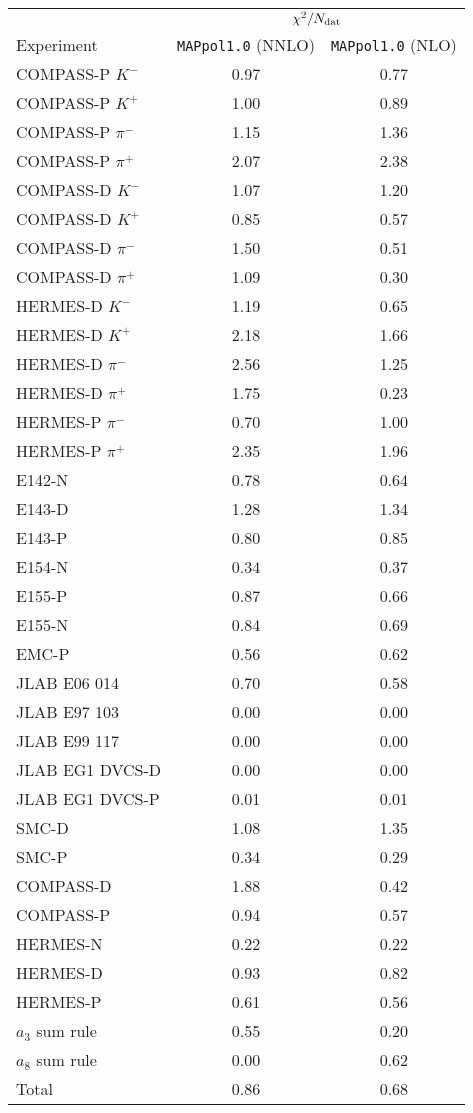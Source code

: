 \begin{tabular}{l@{\hspace{1cm}}c@{\hspace{1cm}}c}
  \toprule \midrule
  \addlinespace
                        & \multicolumn{2}{c}{$\chi^2/N_{\textrm{dat}}$} \\
  \cmidrule(lr){2-3}
      Experiment        &   \texttt{MAPpol1.0} (NNLO)    &    \texttt{MAPpol1.0} (NLO)    \tabularnewline
  \midrule
  \addlinespace
      COMPASS-P $K^-$   &   0.97    &    0.77   \tabularnewline
      COMPASS-P $K^+$   &   1.00    &    0.89   \tabularnewline
    COMPASS-P $\pi^-$   &   1.15    &    1.36   \tabularnewline
    COMPASS-P $\pi^+$   &   2.07    &    2.38   \tabularnewline
      COMPASS-D $K^-$   &   1.07    &    1.20   \tabularnewline
      COMPASS-D $K^+$   &   0.85    &    0.57   \tabularnewline
    COMPASS-D $\pi^-$   &   1.50    &    0.51   \tabularnewline
    COMPASS-D $\pi^+$   &   1.09    &    0.30   \tabularnewline
      HERMES-D  $K^-$   &   1.19    &    0.65   \tabularnewline
      HERMES-D  $K^+$   &   2.18    &    1.66   \tabularnewline
    HERMES-D  $\pi^-$   &   2.56    &    1.25   \tabularnewline
    HERMES-D  $\pi^+$   &   1.75    &    0.23   \tabularnewline
    HERMES-P  $\pi^-$   &   0.70    &    1.00   \tabularnewline
    HERMES-P  $\pi^+$   &   2.35    &    1.96   \tabularnewline
               E142-N   &   0.78    &    0.64   \tabularnewline
               E143-D   &   1.28    &    1.34   \tabularnewline
               E143-P   &   0.80    &    0.85   \tabularnewline
               E154-N   &   0.34    &    0.37   \tabularnewline
               E155-P   &   0.87    &    0.66   \tabularnewline
               E155-N   &   0.84    &    0.69   \tabularnewline
                EMC-P   &   0.56    &    0.62   \tabularnewline
         JLAB E06 014   &   0.70    &    0.58   \tabularnewline
         JLAB E97 103   &   0.00    &    0.00   \tabularnewline
         JLAB E99 117   &   0.00    &    0.00   \tabularnewline
      JLAB EG1 DVCS-D   &   0.00    &    0.00   \tabularnewline
      JLAB EG1 DVCS-P   &   0.01    &    0.01   \tabularnewline
                SMC-D   &   1.08    &    1.35   \tabularnewline
                SMC-P   &   0.34    &    0.29   \tabularnewline
            COMPASS-D   &   1.88    &    0.42   \tabularnewline    
            COMPASS-P   &   0.94    &    0.57   \tabularnewline
             HERMES-N   &   0.22    &    0.22   \tabularnewline
             HERMES-D   &   0.93    &    0.82   \tabularnewline
             HERMES-P   &   0.61    &    0.56   \tabularnewline
       $a_3$ sum rule   &   0.55    &    0.20   \tabularnewline
       $a_8$ sum rule   &   0.00    &    0.62   \tabularnewline
  \midrule
  \addlinespace
                Total   &   0.86    &    0.68   \tabularnewline
  \midrule \bottomrule
\end{tabular}